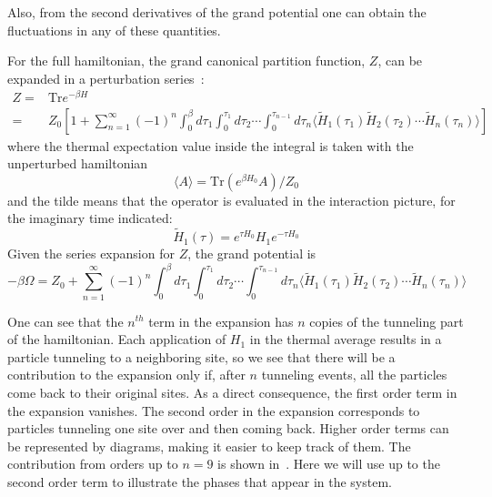\documentclass[11pt,letter]{article}
\begin{document}
Also, from the second derivatives of the grand potential one can obtain the
fluctuations in any of these quantities. 

For the full hamiltonian, the grand canonical partition function, $Z$, can be
expanded in a perturbation series~\cite{Henderson1992}: 
\begin{equation}
\begin{split}
  Z = & \text{Tr} e^{-\beta H}  \\
    = & Z_{0} \left[ 1 + 
        \sum_{n=1}^{\infty} (-1)^{n} 
        \int_{0}^{\beta} d\tau_{1} \int_{0}^{\tau_{1}} d\tau_{2} 
        \dotsm \int_{0}^{\tau_{n-1}} d\tau_{n} 
        \langle
              \tilde{H}_{1}(\tau_{1}) 
              \tilde{H}_{2}(\tau_{2})  \dotsm
              \tilde{H}_{n}(\tau_{n})  \rangle 
              \right] 
\end{split}
\end{equation} 
where the thermal expectation value inside the integral is taken with the
unperturbed hamiltonian
\begin{equation}
\langle A \rangle = \text{Tr} ( e^{\beta H_{0} } A ) / Z_{0} 
\end{equation}
and the tilde means that the operator is evaluated in the interaction picture,
for the imaginary time indicated: 
\begin{equation}
 \tilde{H}_{1}(\tau) = e^{\tau H_{0}} H_{1} e^{-\tau H_{0}} 
\end{equation}
Given the series expansion for $Z$, the grand potential is 
\begin{equation}
 -\beta \Omega = Z_{0} + 
        \sum_{n=1}^{\infty} (-1)^{n} 
        \int_{0}^{\beta} d\tau_{1} \int_{0}^{\tau_{1}} d\tau_{2} 
        \dotsm \int_{0}^{\tau_{n-1}} d\tau_{n} 
        \langle
              \tilde{H}_{1}(\tau_{1}) 
              \tilde{H}_{2}(\tau_{2})  \dotsm
              \tilde{H}_{n}(\tau_{n})  \rangle 
\end{equation}

One can see that the $n^{th}$ term in the expansion has $n$ copies of the
tunneling part of the hamiltonian.  Each  application of $H_{1}$ in the thermal
average results in a particle tunneling to a neighboring site, so we see that
there will be a contribution to the expansion only if, after $n$ tunneling
events, all the particles come back to their original sites.  As a direct
consequence, the first order term in the expansion vanishes.
The second order in the expansion corresponds to particles tunneling one site
over and then coming back.  Higher order terms can be represented by diagrams,
making it easier to keep track of them.  The contribution from orders up to
$n=9$ is shown in~\cite{Henderson1992}.  Here we will use up to the second
order term to illustrate the phases that appear in the system.  
\end{document}
